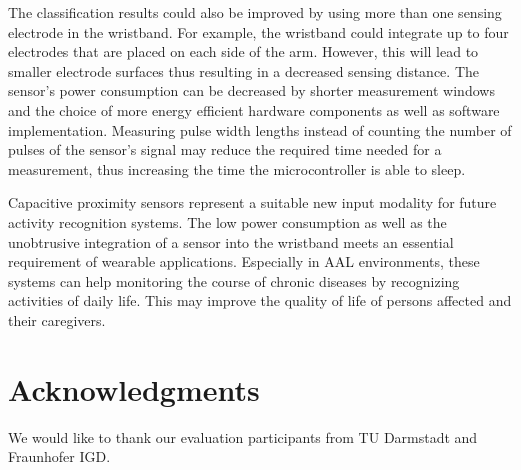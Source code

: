 \documentclass[runningheads,a4paper]{llncs}
\begin{document}
The classification results could also be improved by using more than one sensing electrode in the wristband. For example, the wristband could integrate up to four electrodes that are placed on each side of the arm. However, this will lead to smaller electrode surfaces thus resulting in a decreased sensing distance. The sensor's power consumption can be decreased by shorter measurement windows and the choice of more energy efficient hardware components as well as software implementation. Measuring pulse width lengths instead of counting the number of pulses of the sensor's signal may reduce the required time needed for a measurement, thus increasing the time the microcontroller is able to sleep.

Capacitive proximity sensors represent a suitable new input modality for future activity recognition systems. The low power consumption as well as the unobtrusive integration of a sensor into the wristband meets an essential requirement of wearable applications. Especially in AAL environments, these systems can help monitoring the course of chronic diseases by recognizing activities of daily life. This may improve the quality of life of persons affected and their caregivers. 

\section*{Acknowledgments}

We would like to thank our evaluation participants from TU Darmstadt and Fraunhofer IGD.


%
\end{document}
